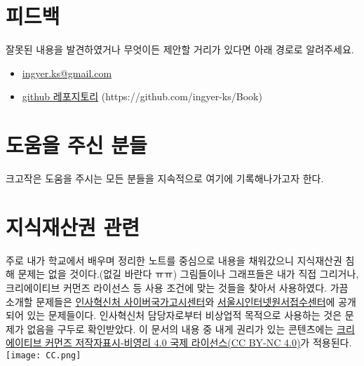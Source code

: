\section{피드백}
잘못된 내용을 발견하였거나 무엇이든 제안할 거리가 있다면 아래 경로로 알려주세요.
\begin{itemize}
    \item \href{mailto:ingyer.ks@gmail.com}{ingyer.ks@gmail.com}
    \item \href{https://github.com/ingyer-ks/Book}{github 레포지토리} (https://github.com/ingyer-ks/Book)
\end{itemize}
\section{도움을 주신 분들}
크고작은 도움을 주시는 모든 분들을 지속적으로 여기에 기록해나가고자 한다.

\section{지식재산권 관련}
주로 내가 학교에서 배우며 정리한 노트를 중심으로 내용을 채워갔으니 지식재산권 침해 문제는 없을 것이다.(없길 바란다 ㅠㅠ) 
그림들이나 그래프들은 내가 직접 그리거나, 크리에이티브 커먼즈 라이선스 등 사용 조건에 맞는 것들을 찾아서 사용하였다.
가끔 소개할 문제들은 \href{https://www.gosi.kr}{인사혁신처 사이버국가고시센터}와 \href{http://gosi.seoul.go.kr}{서울시인터넷원서접수센터}에 공개되어 있는 문제들이다.
인사혁신처 담당자로부터 비상업적 목적으로 사용하는 것은 문제가 없음을 구두로 확인받았다.
이 문서의 내용 중 내게 권리가 있는 콘텐츠에는 \href{https://creativecommons.org/licenses/by-nc/4.0/}{크리에이티브 커먼즈 저작자표시-비영리 4.0 국제 라이선스(CC BY-NC 4.0)}가 적용된다.
\\
\texttt{[image: CC.png]}
